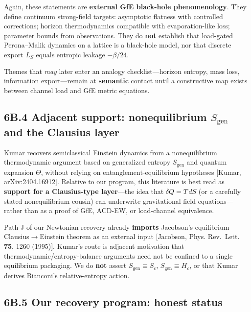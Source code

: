 \documentclass[
  11pt,
]{article}
\newcounter{none} %
\begin{document}
Again, these statements are \textbf{external GfE black-hole
phenomenology}. They define continuum strong-field targets: asymptotic
flatness with controlled corrections; horizon thermodynamics compatible
with evaporation-like loss; parameter bounds from observations. They do
\textbf{not} establish that load-gated Perona--Malik dynamics on a
lattice is a black-hole model, nor that discrete export \(L_S\) equals
entropic leakage \(-\beta/24\).

Themes that \emph{may} later enter an analogy checklist---horizon
entropy, mass loss, information export---remain at \textbf{semantic}
contact until a constructive map exists between channel load and GfE
metric equations.

\subsection{\texorpdfstring{6B.4 Adjacent support: nonequilibrium
\(S_{\mathrm{gen}}\) and the Clausius
layer}{6B.4 Adjacent support: nonequilibrium S\_\{\textbackslash mathrm\{gen\}\} and the Clausius layer}}\label{b.4-adjacent-support-nonequilibrium-s_mathrmgen-and-the-clausius-layer}

Kumar recovers semiclassical Einstein dynamics from a nonequilibrium
thermodynamic argument based on generalized entropy \(S_{\mathrm{gen}}\)
and quantum expansion \(\Theta\), without relying on
entanglement-equilibrium hypotheses [Kumar, arXiv:2404.16912].
Relative to our program, this literature is best read as \textbf{support
for a Clausius-type layer}---the idea that \(\delta Q=T\,dS\) (or a
carefully stated nonequilibrium cousin) can underwrite gravitational
field equations---rather than as a proof of GfE, ACD-EW, or load-channel
equivalence.

Path J of our Newtonian recovery already \textbf{imports} Jacobson's
equilibrium Clausius$\to$Einstein theorem as an external input [Jacobson,
Phys. Rev.~Lett. \textbf{75}, 1260 (1995)]. Kumar's route is adjacent
motivation that thermodynamic/entropy-balance arguments need not be
confined to a single equilibrium packaging. We do \textbf{not} assert
\(S_{\mathrm{gen}}\equiv S_c\), \(S_{\mathrm{gen}}\equiv H_c\), or that
Kumar derives Bianconi's relative-entropy action.

\subsection{6B.5 Our recovery program: honest
status}\label{b.5-our-recovery-program-honest-status}
\end{document}
